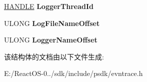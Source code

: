 \begin{DoxyCompactItemize}
\item 
\mbox{\label{struct___e_v_e_n_t___t_r_a_c_e___p_r_o_p_e_r_t_i_e_s_aa33833ed4c9c9fb9b4effbcd4582246f}} 
\hyperlink{interfacevoid}{H\+A\+N\+D\+LE} {\bfseries Logger\+Thread\+Id}
\item 
\mbox{\label{struct___e_v_e_n_t___t_r_a_c_e___p_r_o_p_e_r_t_i_e_s_aa0f0e6233c15943e1bdaf1b248f6f362}} 
U\+L\+O\+NG {\bfseries Log\+File\+Name\+Offset}
\item 
\mbox{\label{struct___e_v_e_n_t___t_r_a_c_e___p_r_o_p_e_r_t_i_e_s_ac807373c85df80d3f42e5a2e4eba8637}} 
U\+L\+O\+NG {\bfseries Logger\+Name\+Offset}
\end{DoxyCompactItemize}


该结构体的文档由以下文件生成\+:\begin{DoxyCompactItemize}
\item 
E\+:/\+React\+O\+S-\/0../sdk/include/psdk/evntrace.\+h\end{DoxyCompactItemize}
